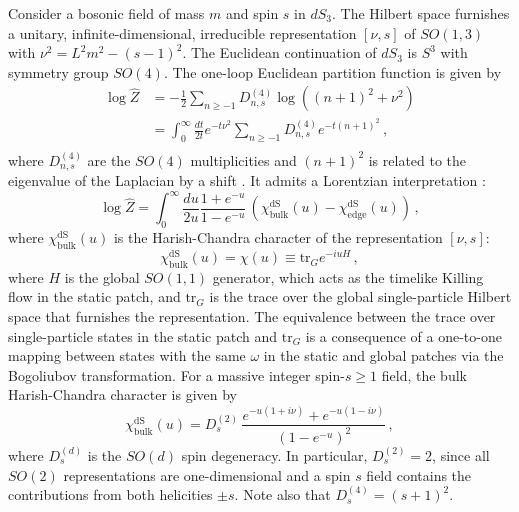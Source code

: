 \documentclass[aps,prl, reprint, superscriptaddress, 10pt]{revtex4-2}
\newcommand{\1}{\textbf{1}}
\newcommand{\tr}{\mbox{tr}}
\newcommand{\+}{{\,+ \,}}
\begin{document}
Consider a bosonic field of mass $m$ and spin $s$ in $dS_3$.
The Hilbert space furnishes a unitary, infinite-dimensional, irreducible representation $[\nu, s]$ of $SO(1, 3)$ with $\nu^2 = L^2 m^2 - (s-1)^2$. The Euclidean continuation of $dS_3$ is $S^3$ with symmetry group $SO(4)$. The one-loop Euclidean partition function is given by
\begin{equation} \label{heatkerneldS}
\begin{split}
	\log \hat{Z} &= - \frac{1}{2} \sum_{n\geq -1} D_{n,s}^{(4)} \log((n+1)^2 + \nu^2) \\
	&= \int_0^\infty \frac{dt}{2t} e^{-t \nu^2} \sum_{n\geq -1} D_{n,s}^{(4)} e^{-t \left( n + 1\right)^2 } \, , \\
\end{split}
\end{equation}
where $D_{n,s}^{(4)}$ are the $SO(4)$ multiplicities and $(n+1)^2$ is related to the eigenvalue of the Laplacian by a shift \cite{David:2009xg, Anninos:2020hfj}. It admits a Lorentzian interpretation \cite{Anninos:2020hfj}:
\begin{equation} \label{oneloopchar}
	\log \hat{Z} = \int_0^\infty \frac{du}{2u} \frac{1+ e^{-u}}{1 - e^{-u}} \, \left(\chi^{\text{dS}}_{\text{bulk}}(u) - \chi^{\text{dS}}_{\text{edge}}(u) \right) \, ,
\end{equation}
where $\chi^{\text{dS}}_{\text{bulk}}(u)$ is the Harish-Chandra character \cite{HarishChandra:1956, HarishChandra:1963} of the representation $[\nu, s]$:
\begin{equation}
	\chi^{\text{dS}}_{\text{bulk}}(u) = \chi(u) \equiv \tr_G e^{-i u H} \, ,
\end{equation}
where $H$ is the global $SO(1,1)$ generator, which acts as the timelike Killing flow in the static patch, and $\tr_G$ is the trace over the global single-particle Hilbert space that furnishes the representation. The equivalence between the trace over single-particle states in the static patch and $\tr_G$ is a consequence of a one-to-one mapping between states with the same $\omega$ in the static and global patches via the Bogoliubov transformation. For a massive integer spin-$s \geq 1$ field, the bulk Harish-Chandra character is given by
\begin{equation}\label{bulk-char}
	\chi^{\text{dS}}_{\text{bulk}}(u) = D_s^{(2)} \,
	\frac{ e^{- u (1 + i\nu) } + e^{- u (1 - i\nu )} }{ (1 - e^{-u})^{2} } \, ,
\end{equation}
where $D^{(d)}_s$ is the $SO(d)$ spin degeneracy. In particular, $D^{(2)}_s =2$, since all $SO(2)$ representations are one-dimensional and a spin $s$ field contains the contributions from both helicities $\pm s$. Note also that $D^{(4)}_{s} = (s+1)^2$.
\end{document}
